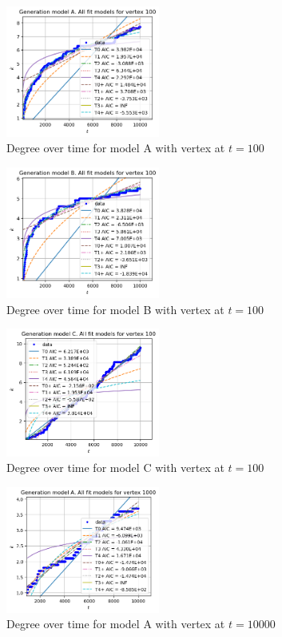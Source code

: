 \documentclass[a4paper]{article}
\begin{document}
%
\begin{figure}[H]
    \centering
		\includegraphics[width=0.45\textwidth]{modelA/all_dt100.png}
		\caption{Degree over time for model A with vertex at $t=100$}
\end{figure}
%
\begin{figure}[H]
    \centering
		\includegraphics[width=0.45\textwidth]{modelB/all_dt100.png}
		\caption{Degree over time for model B with vertex at $t=100$}
\end{figure}
%
\begin{figure}[H]
		\centering
		\includegraphics[width=0.45\textwidth]{modelC/all_dt100.png}
		\caption{Degree over time for model C with vertex at $t=100$}
\end{figure}
%
\begin{figure}[H]
    \centering
		\includegraphics[width=0.45\textwidth]{modelA/all_dt1000.png}
		\caption{Degree over time for model A with vertex at $t=10000$}
\end{figure}
\end{document}
